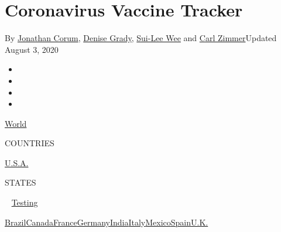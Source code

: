 \hypertarget{coronavirus-vaccine-tracker}{%
\section{Coronavirus Vaccine
Tracker}\label{coronavirus-vaccine-tracker}}

By \href{https://www.nytimes.com/by/jonathan-corum}{Jonathan Corum},
\href{https://www.nytimes.com/by/denise-grady}{Denise Grady},
\href{https://www.nytimes.com/by/sui-lee-wee}{Sui-Lee Wee} and
\href{https://www.nytimes.com/by/carl-zimmer}{Carl Zimmer}Updated August
3, 2020

\begin{itemize}
\item
\item
\item
\item
\end{itemize}

\href{https://www.nytimes.com/interactive/2020/world/coronavirus-maps.html}{World}~

COUNTRIES

\textbar{}
\href{https://www.nytimes.com/interactive/2020/us/coronavirus-us-cases.html}{U.S.A.}~

STATES

~
\href{https://www.nytimes.com/interactive/2020/us/coronavirus-testing.html}{Testing}

\href{https://www.nytimes.com/interactive/2020/world/americas/brazil-coronavirus-cases.html}{Brazil}\href{https://www.nytimes.com/interactive/2020/world/canada/canada-coronavirus-cases.html}{Canada}\href{https://www.nytimes.com/interactive/2020/world/europe/france-coronavirus-cases.html}{France}\href{https://www.nytimes.com/interactive/2020/world/europe/germany-coronavirus-cases.html}{Germany}\href{https://www.nytimes.com/interactive/2020/world/asia/india-coronavirus-cases.html}{India}\href{https://www.nytimes.com/interactive/2020/world/europe/italy-coronavirus-cases.html}{Italy}\href{https://www.nytimes.com/interactive/2020/world/americas/mexico-coronavirus-cases.html}{Mexico}\href{https://www.nytimes.com/interactive/2020/world/europe/spain-coronavirus-cases.html}{Spain}\href{https://www.nytimes.com/interactive/2020/world/europe/united-kingdom-coronavirus-cases.html}{U.K.}

